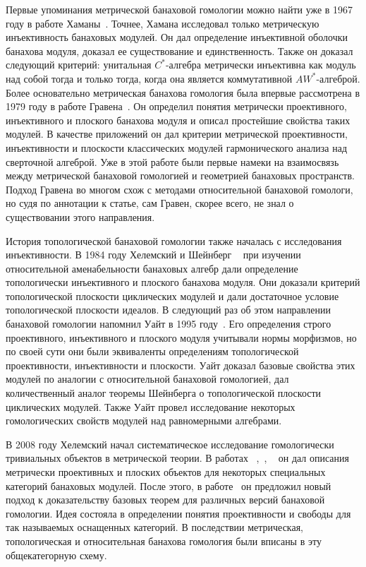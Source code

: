 Первые упоминания метрической банаховой гомологии можно найти уже в 1967 году в
работе Хаманы~\cite{HamInjEnvBanMod}. Точнее, Хамана исследовал только
метрическую инъективность банаховых модулей. Он дал определение инъективной
оболочки банахова модуля, доказал ее существование и единственность. Также он
доказал следующий критерий: унитальная $C^*$-алгебра метрически инъективна как
модуль над собой тогда и только тогда, когда она является коммутативной
$AW^*$-алгеброй. Более основательно метрическая банахова гомология была впервые
рассмотрена в 1979 году в работе Гравена~\cite{GravInjProjBanMod}. Он определил
понятия метрически проективного, инъективного и плоского банахова модуля и
описал простейшие свойства таких модулей. В качестве приложений он дал критерии
метрической проективности, инъективности и плоскости классических модулей
гармонического анализа над сверточной алгеброй. Уже в этой работе были первые
намеки на взаимосвязь между метрической банаховой гомологией и геометрией
банаховых пространств. Подход Гравена во многом схож с методами относительной
банаховой гомологи, но судя по аннотации к статье, сам Гравен, скорее всего, не
знал о существовании этого направления.

История топологической банаховой гомологии также началась с исследования
инъективности. В 1984 году Хелемский и Шейнберг
~\cite{HelemSheinbergFlatBanModAndAmenBanAlg} при изучении относительной
аменабельности банаховых алгебр дали определение топологически инъективного и
плоского банахова модуля. Они доказали критерий топологической плоскости
циклических модулей и дали достаточное условие топологической плоскости идеалов.
В следующий раз об этом направлении банаховой гомологии напомнил Уайт в 1995
году~\cite{WhiteInjmoduAlg}. Его определения строго проективного, инъективного и
плоского модуля учитывали нормы морфизмов, но по своей сути они были эквиваленты
определениям топологической проективности, инъективности и плоскости. Уайт
доказал базовые свойства этих модулей по аналогии с относительной банаховой
гомологией, дал количественный аналог теоремы Шейнберга о топологической
плоскости циклических модулей. Также Уайт провел исследование некоторых
гомологических свойств модулей над равномерными алгебрами. 

В 2008 году Хелемский начал систематическое исследование гомологически
тривиальных объектов в метрической теории. В работах
~\cite{HelemNonMatrVersnExtPrincplByArvsnWttstck},~\cite{HelMetrFlatNorMod},
~\cite{HelemExtrmVersnProjNorModOverSeqAlgs} он дал описания метрически
проективных и плоских объектов для некоторых специальных категорий банаховых
модулей. После этого, в работе~\cite{HelMetrFrQMod} он предложил новый подход к
доказательству базовых теорем для различных версий банаховой гомологии. Идея
состояла в определении понятия проективности и свободы для так называемых
оснащенных категорий. В последствии метрическая, топологическая и относительная
банахова гомология были вписаны в эту общекатегорную схему. 

